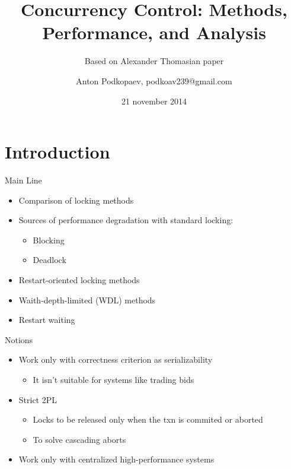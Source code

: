 \documentclass[sans]{beamer}
\begin{document}
\title
[Concurrency Control]
{Concurrency Control: Methods, Performance, and Analysis}

\subtitle{Based on Alexander Thomasian paper}

\author
[Podkopaev]{Anton Podkopaev, podkoav239@gmail.com}
\date [21-11-14]{21 november 2014}

\begin{frame}[plain]
	\titlepage
\end{frame}

\section{Introduction}

\begin{frame}{Main Line}
  \begin{itemize}
    \item Comparison of locking methods

    \item Sources of performance degradation with standard locking:
      \begin{itemize}
        \item Blocking
        \item Deadlock
      \end{itemize}

    \item Restart-oriented locking methods
    \item Waith-depth-limited (WDL) methods

    \item Restart waiting
  \end{itemize}
\end{frame}

\begin{frame}{Notions}
  \begin{itemize}
    \item Work only with correctness criterion as serializability
    \begin{itemize}
      \item It isn't suitable for systems like trading bids
    \end{itemize}
    
    \item Strict 2PL
    \begin{itemize}
      \item Locks to be released only when the txn is
            commited or aborted
      \item To solve cascading aborts
    \end{itemize}

    \item Work only with centralized high-performance systems
  \end{itemize}
\end{frame}
\end{document}
